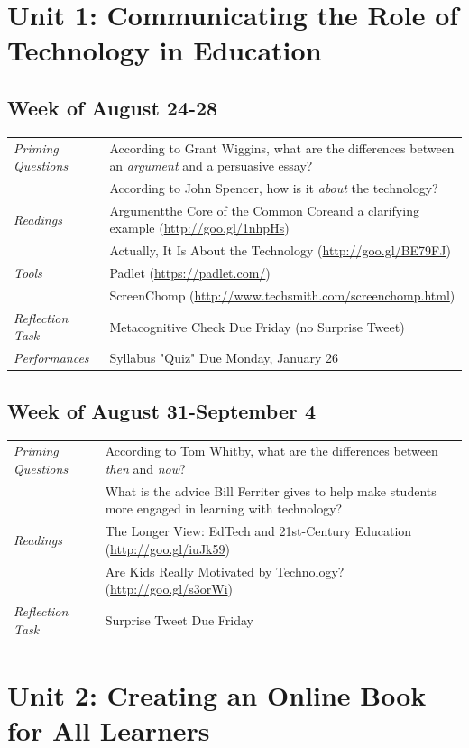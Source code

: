 \documentclass{tufte-handout}
\newcommand{\tabpq}{\faQuestionSign\medspace\textit{Priming Questions}}
\newcommand{\tabread}{\faBook\medspace\textit{Readings}}
\newcommand{\tabtools}{\faWrench\medspace\textit{Tools}}
\newcommand{\tabtweet}{\faLightbulb\medspace\textit{Reflection Task} & Surprise Tweet Due Friday \\}
\newcommand{\tabcheck}{\faLightbulb\medspace\textit{Reflection Task} & Metacognitive Check Due Friday (no Surprise Tweet) \\}
\newcommand{\tabperformance}{\faTasks\medspace\textit{Performances}}
\newenvironment{tabsched}
	{\small
	\begin{tabular}{p{1.5in}p{5in}}
	\toprule}
	{\bottomrule
	\end{tabular}
	\normalsize}
\newcommand{\weektwo}{August 24-28}
\newcommand{\weekthree}{August 31-September 4}
\begin{document}
\section{Unit 1: Communicating the Role of Technology in Education}

\subsection{Week of \weektwo}

\begin{tabsched}
	\tabpq & According to Grant Wiggins, what are the differences between an \emph{argument} and a persuasive essay? \\
	& According to John Spencer, how is it \emph{about} the technology? \\
	\midrule
	\tabread & Argument\textemdash{}the Core of the Common Core\textemdash{}and a clarifying example (\url{http://goo.gl/1nhpHs}) \\
	& Actually, It Is About the Technology (\url{http://goo.gl/BE79FJ}) \\
	\midrule
	\tabtools & Padlet (\url{https://padlet.com/}) \\
	& ScreenChomp (\url{http://www.techsmith.com/screenchomp.html}) \\
	\midrule
	\tabcheck
	\midrule
	\tabperformance & Syllabus "Quiz" Due Monday, January 26 \\
\end{tabsched}

\subsection{Week of \weekthree}

\begin{tabsched}
	\tabpq & According to Tom Whitby, what are the differences between \textit{then} and \textit{now}? \\
	& What is the advice Bill Ferriter gives to help make students more engaged in learning with technology? \\
	\midrule
	\tabread & The Longer View: EdTech and 21st-Century Education (\url{http://goo.gl/iuJk59}) \\
	& Are Kids Really Motivated by Technology? (\url{http://goo.gl/s3orWi}) \\
	\midrule
	\tabtweet
\end{tabsched}

\section{Unit 2: Creating an Online Book for All Learners}
\end{document}

